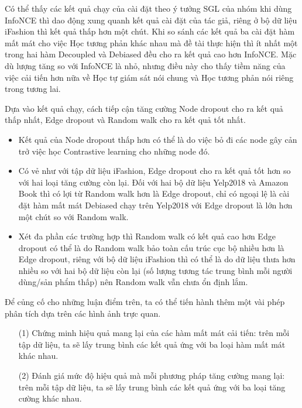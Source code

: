 Có thể thấy các kết quả chạy của cài đặt theo ý tưởng SGL của nhóm khi dùng InfoNCE thì dao động xung quanh kết quả cài đặt của tác giả, riêng ở bộ dữ liệu iFashion thì kết quả thấp hơn một chút. Khi so sánh các kết quả ba cài đặt hàm mất mát cho việc Học tương phản khác nhau mà đề tài thực hiện thì ít nhất một trong hai hàm Decoupled và Debiased đều cho ra kết quả cao hơn InfoNCE. Mặc dù lượng tăng so với InfoNCE là nhỏ, nhưng điều này cho thấy tiềm năng của việc cải tiến hơn nữa về Học tự giám sát nói chung và Học tương phản nói riêng trong tương lai.

Dựa vào kết quả chạy, cách tiếp cận tăng cường Node dropout cho ra kết quả thấp nhất, Edge dropout và Random walk cho ra kết quả tốt nhất.
\begin{itemize}
    \item Kết quả của Node dropout thấp hơn có thể là do việc bỏ đi các node gây cản trở việc học Contrastive learning cho những node đó.

    \item Có vẻ như với tập dữ liệu iFashion, Edge dropout cho ra kết quả tốt hơn so với hai loại tăng cường còn lại. Đối với hai bộ dữ liệu Yelp2018 và Amazon Book thì có lợi từ Random walk hơn là Edge dropout, chỉ có ngoại lệ là cài đặt hàm mất mát Debiased chạy trên Yelp2018 với Edge dropout là lớn hơn một chút so với Random walk.

    \item Xét đa phần các trường hợp thì Random walk có kết quả cao hơn Edge dropout có thể là do Random walk bảo toàn cấu trúc cục bộ nhiều hơn là Edge dropout, riêng với bộ dữ liệu iFashion thì có thể là do dữ liệu thưa hơn nhiều so với hai bộ dữ liệu còn lại (số lượng tương tác trung bình mỗi người dùng/sản phẩm thấp) nên Random walk vẫn chưa ổn định lắm.
\end{itemize}

Để củng cố cho những luận điểm trên, ta có thể tiến hành thêm một vài phép phân tích dựa trên các hình ảnh trực quan.
\begin{itemize}
    \item[(1)] Chứng minh hiệu quả mang lại của các hàm mất mát cải tiến: trên mỗi tập dữ liệu, ta sẽ lấy trung bình các kết quả ứng với ba loại hàm mất mát khác nhau.
    
    \item[(2)] Đánh giá mức độ hiệu quả mà mỗi phương pháp tăng cường mang lại: trên mỗi tập dữ liệu, ta sẽ lấy trung bình các kết quả ứng với ba loại tăng cường khác nhau. 
\end{itemize}

